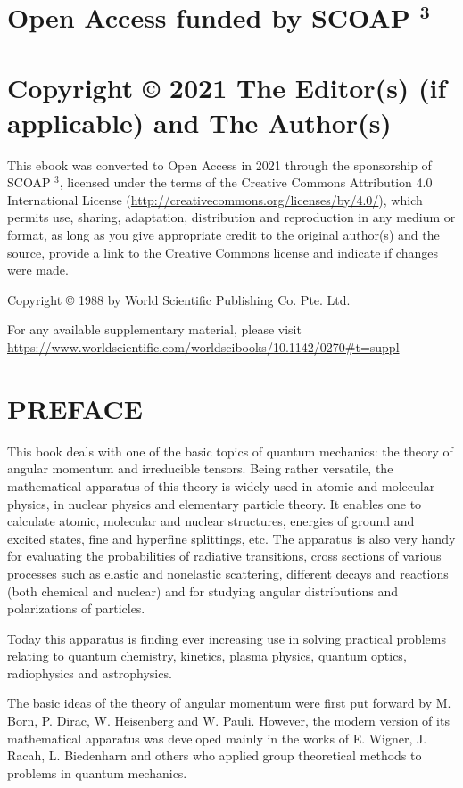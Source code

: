 \section*{Open Access funded by SCOAP ${ }^{\mathbf{3}}$}
\section*{Copyright © 2021 The Editor(s) (if applicable) and The Author(s)}
This ebook was converted to Open Access in 2021 through the sponsorship of SCOAP ${ }^{3}$, licensed under the terms of the Creative Commons Attribution 4.0 International License (\href{http://creativecommons.org/licenses/by/4.0/}{http://creativecommons.org/licenses/by/4.0/}), which permits use, sharing, adaptation, distribution and reproduction in any medium or format, as long as you give appropriate credit to the original author(s) and the source, provide a link to the Creative Commons license and indicate if changes were made.

Copyright © 1988 by World Scientific Publishing Co. Pte. Ltd.

For any available supplementary material, please visit\\
\href{https://www.worldscientific.com/worldscibooks/10.1142/0270#t=suppl}{https://www.worldscientific.com/worldscibooks/10.1142/0270\#t=suppl}

\section*{PREFACE}
This book deals with one of the basic topics of quantum mechanics: the theory of angular momentum and irreducible tensors. Being rather versatile, the mathematical apparatus of this theory is widely used in atomic and molecular physics, in nuclear physics and elementary particle theory. It enables one to calculate atomic, molecular and nuclear structures, energies of ground and excited states, fine and hyperfine splittings, etc. The apparatus is also very handy for evaluating the probabilities of radiative transitions, cross sections of various processes such as elastic and nonelastic scattering, different decays and reactions (both chemical and nuclear) and for studying angular distributions and polarizations of particles.

Today this apparatus is finding ever increasing use in solving practical problems relating to quantum chemistry, kinetics, plasma physics, quantum optics, radiophysics and astrophysics.

The basic ideas of the theory of angular momentum were first put forward by M. Born, P. Dirac, W. Heisenberg and W. Pauli. However, the modern version of its mathematical apparatus was developed mainly in the works of E. Wigner, J. Racah, L. Biedenharn and others who applied group theoretical methods to problems in quantum mechanics.

